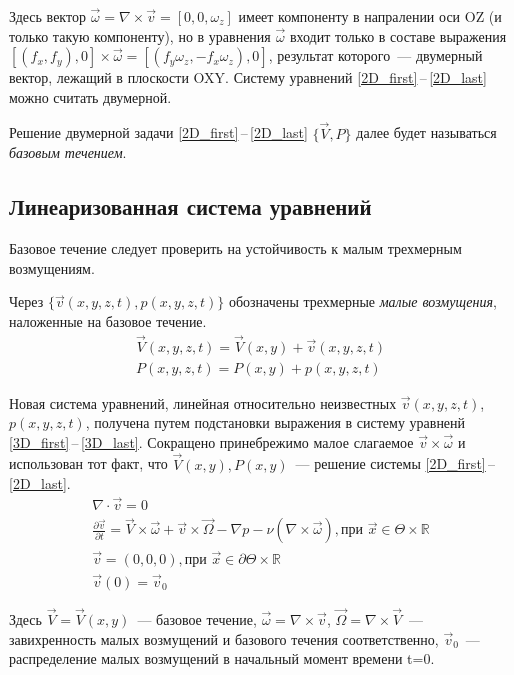Здесь вектор $ \vec \omega = \nabla \times \vec v = [0,0,\omega_z]$ имеет компоненту в напралении оси OZ (и только такую компоненту), но в уравнения $ \vec \omega $ входит только в составе выражения $ [(f_x,f_y),0] \times \vec \omega = [(f_y \omega_z, -f_x \omega_z), 0]$, результат которого~--- двумерный вектор, лежащий в плоскости OXY. Систему уравнений \ref{2D_first}\,--\,\ref{2D_last} можно считать двумерной. 

Решение двумерной задачи \ref{2D_first}\,--\,\ref{2D_last} $\{ \vec V, P \}$ далее будет называться \textit{базовым течением}.

\subsection{Линеаризованная система уравнений}

Базовое течение следует проверить на устойчивость к малым трехмерным возмущениям.

Через $\{ \vec v(x,y,z,t), p(x,y,z,t) \} $ обозначены трехмерные \textit{малые возмущения}, наложенные на базовое течение. 
\begin{gather*}
  \vec V(x,y,z,t) = \vec V(x,y) + \vec v(x,y,z,t) \\
  P(x,y,z,t) = P(x,y) + p(x,y,z,t)
\end{gather*}

Новая система уравнений, линейная относительно неизвестных $ \vec v(x,y,z,t)$, $p(x,y,z,t) $, получена путем подстановки выражения в систему уравненй \ref{3D_first}\,--\,\ref{3D_last}. Сокращено принебрежимо малое слагаемое $ \vec v \times \vec \omega $ и использован тот факт, что  $\vec V(x,y), P(x,y) $~--- решение системы \ref{2D_first}\,--\,\ref{2D_last}.
\begin{gather} 
  \label{lin3D_first}
  \nabla \cdot \vec v = 0\\
  \frac{\partial \vec v}{\partial t} = \vec V \times \vec \omega + \vec v \times \vec \Omega - \nabla p - \nu ( \nabla \times \vec \omega ), \text{при } \vec x \in \Theta \times \mathbb{R}\\
  \vec v = (0,0,0), \text{при } \vec x \in \partial \Theta \times \mathbb{R} \\
  \vec v (0) = \vec v _0 \label{lin3D_last}
\end{gather}

Здесь $\vec V = \vec V(x,y) $~--- базовое течение, $ \vec \omega = \nabla \times \vec v $, $ \vec \Omega = \nabla \times \vec V $~--- завихренность малых возмущений и базового течения соответственно, $\vec v_0$~--- распределение малых возмущений в начальный момент времени t=0. 

